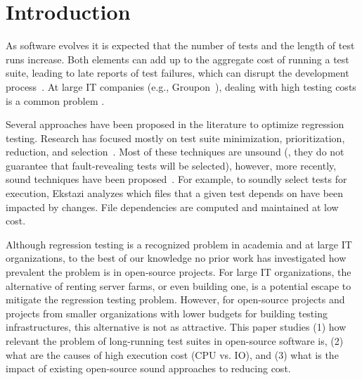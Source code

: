 \section{Introduction}

As software evolves it is expected that the number of tests and the
length of test runs increase.  Both elements can add up to the
aggregate cost of running a test suite, leading to late reports of test
failures, which can disrupt the development
process~\cite{hilton-etal-ase2016}.  At large IT companies (e.g.,
Groupon~\cite{kim-etal-fse2013}), dealing with high testing costs is a
common problem .  

Several approaches have been proposed in the literature to optimize
regression testing.  Research has focused mostly on test suite
minimization, prioritization, reduction, and
selection~\cite{yoo-harman-stvr2012}.  Most of these techniques are
unsound (\ie{}, they do not guarantee that fault-revealing tests will
be selected), however, more recently, sound techniques have been
proposed~\cite{gligoric-etal-issta2015,soetens-etal-2016}.  For
example, to soundly select tests for execution,
Ekstazi\cite{ekstazi-web,gligoric-etal-issta2015} analyzes which files
that a given test depends on have been impacted by changes. File
dependencies are computed and maintained at low cost.

Although regression testing is a recognized problem in academia and at
large IT organizations, to the best of our knowledge no prior work has
investigated how prevalent the problem is in open-source projects.
For large IT organizations, the alternative of renting server farms,
or even building one, is a potential escape to mitigate the regression
testing problem.  However, for open-source projects and projects from
smaller organizations with lower budgets for building testing
infrastructures, this alternative is not as attractive.  This paper
studies (1) how relevant the problem of long-running test suites in
open-source software is, (2) what are the causes of high execution
cost (CPU vs. IO), and (3) what is the impact of existing open-source
sound approaches to reducing cost.

\Fix{--------------}

